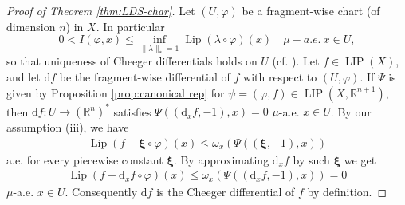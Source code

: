 \documentclass{amsart}
\numberwithin{equation}{section}
\newcommand{\R}{\mathbb{R}}
\newcommand{\Lip}{\operatorname{Lip}}
\newcommand{\LIP}{\operatorname{LIP}}
\newcommand{\ud}{\mathrm {d}}
\begin{document}
\begin{proof}[Proof of Theorem \ref{thm:LDS-char}]
	Let $(U,\varphi)$ be a fragment-wise chart (of dimension $n$) in $X$. In particular 
	\[
	0<I(\varphi,x)\le \inf_{\|\lambda\|_\ast=1}\Lip(\lambda\circ\varphi)(x)\quad\mu-a.e.\ x\in U,
	\]
	so that uniqueness of Cheeger differentials holds on $U$ (cf. \cite[Lemma 3.3]{bate15}). Let $f\in \LIP(X)$, and let $\ud f$ be the fragment-wise differential of $f$ with respect to $(U,\varphi)$. If $\Psi$ is given by Proposition \ref{prop:canonical rep} for $\psi=(\varphi,f)\in\LIP(X,\R^{n+1})$, then $\ud f:U\to (\R^n)^*$ satisfies $\Psi((\ud_xf,-1),x)=0$ $\mu$-a.e. $x\in U$. By our assumption (iii), we have 
    \begin{align*}
		\Lip(f- \bm\xi \circ\varphi)(x)\le \omega_x\left(\Psi((\bm\xi ,-1),x)\right)
	\end{align*}
 a.e. for every piecewise constant $\bm\xi$. By approximating $\ud_x f$ by such $\bm\xi$ we get
	\begin{align*}
		\Lip(f-\ud_x f\circ\varphi)(x)\le \omega_x\left(\Psi((\ud_xf,-1),x)\right)=0
	\end{align*}
	$\mu$-a.e. $x\in U$. Consequently $\ud f$ is the Cheeger differential of $f$ by definition.
\end{proof}



\end{document}

